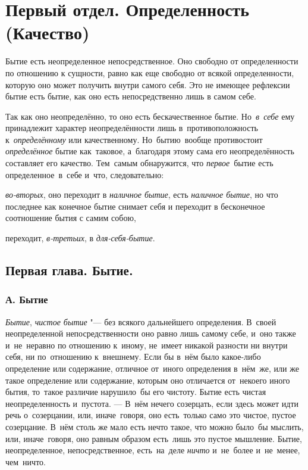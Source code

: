 \clearpage
\part[Первый отдел \newline ОПРЕДЕЛЕННОСТЬ (КАЧЕСТВО)]{Первый отдел. Определенность (Качество)}
Бытие есть неопределенное непосредственное. Оно свободно от определенности
по отношению к сущности, равно как еще свободно от всякой определенности,
которую оно может получить внутри самого себя. Это не имеющее рефлексии
бытие есть бытие, как оно есть непосредственно лишь в самом себе.

Так как оно неопределённо, то оно есть бескачественное бытие.
Но~{\em в~себе} ему принадлежит характер неопределённости
лишь в~противоположность к~{\em определённому} или
качественному. Но~бытию~вообще противостоит
{\em определённое} бытие как~таковое, а~благодаря этому
сама его неопределённость составляет его качество. Тем~самым
обнаружится, что {\em первое}~бытие есть определенное~в~себе
и~что, следовательно:

{\em во-вторых}, оно переходит в
{\em наличное бытие}, есть
{\em наличное бытие}, но что последнее как конечное
бытие снимает себя и переходит в бесконечное соотношение бытия с самим
собою,

переходит, {\em в-третьих}, в
{\em для-себя-бытие}.

\chapter[{\em Первая глава} Бытие]{Первая глава. Бытие.}
\section[А. Бытие]{А. Бытие}

{\em Бытие}, {\em чистое бытие} "--- без всякого дальнейшего определения.
В~своей неопределенной непосредственности оно равно лишь
самому себе, и~оно также и~не~неравно по отношению к~иному, не~имеет
никакой разности ни внутри себя, ни по~отношению к~внешнему. Если бы
в~нём было какое-либо определение или
содержание, отличное от~иного определения в~нём~же, или же такое
определение или содержание, которым оно отличается от~некоего иного
бытия, то~такое различие нарушило~бы его чистоту. Бытие есть чистая
неопределенность и~пустота. --- В~нём нечего созерцать, если здесь
может идти речь о~созерцании, или, иначе~говоря, оно есть~только само
это чистое, пустое созерцание.
В~нём столь же мало есть нечто такое, что можно было~бы
мыслить, или, иначе~говоря, оно равным образом есть~лишь это пустое
мышление. Бытие, неопределенное, непосредственное, есть~на~деле
{\em ничто} и~не~более и~не~менее, чем~ничто.

